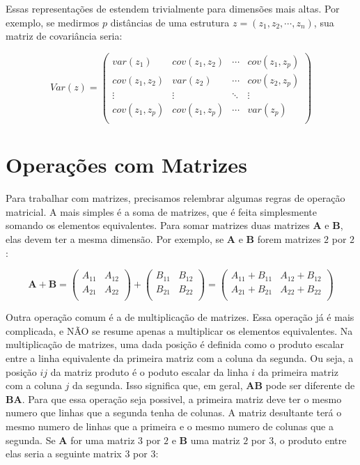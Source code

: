 \documentclass[portuges,]{tufte-handout}
\begin{document}
Essas representações de estendem trivialmente para dimensões mais altas.
Por exemplo, se medirmos \(p\) distâncias de uma estrutura
\(z = (z_1, z_2, \cdots, z_n)\), sua matriz de covariância seria:

\[
Var(z) = \left (
\begin{matrix}
var(z_1) & cov(z_1, z_2) & \cdots & cov(z_1, z_p) \\
cov(z_1, z_2) & var(z_2) & \cdots & cov(z_2, z_p) \\
\vdots & \vdots  & \ddots & \vdots                \\
cov(z_1, z_p) & cov(z_1, z_p) & \cdots & var(z_p) \\
\end{matrix}
\right )
\]

\section{Operações com Matrizes}\label{operauxe7uxf5es-com-matrizes}

Para trabalhar com matrizes, precisamos relembrar algumas regras de
operação matricial. A mais simples é a soma de matrizes, que é feita
simplesmente somando os elementos equivalentes. Para somar matrizes duas
matrizes \(\mathbf{A}\) e \(\mathbf{B}\), elas devem ter a mesma
dimensão. Por exemplo, se \(\mathbf{A}\) e \(\mathbf{B}\) forem matrizes
\(2\) por \(2\):

\[
\mathbf{A} + \mathbf{B} =
\left (
\begin{matrix}
A_{11} & A_{12}\\
A_{21} & A_{22}  \\
\end{matrix}
\right )
+
\left (
\begin{matrix}
B_{11} & B_{12}\\
B_{21} & B_{22}  \\
\end{matrix}
\right )
=
 \left (
\begin{matrix}
A_{11}+B_{11} & A_{12}+B_{12}\\
A_{21}+B_{21} & A_{22}+B_{22} \\
\end{matrix}
\right )
\]

Outra operação comum é a de multiplicação de matrizes. Essa operação já
é mais complicada, e NÃO se resume apenas a multiplicar os elementos
equivalentes. Na multiplicação de matrizes, uma dada posição é definida
como o produto escalar entre a linha equivalente da primeira matriz com
a coluna da segunda. Ou seja, a posição \(ij\) da matriz produto é o
poduto escalar da linha \(i\) da primeira matriz com a coluna \(j\) da
segunda. Isso significa que, em geral, \(\mathbf{A}\mathbf{B}\) pode ser
diferente de \(\mathbf{B}\mathbf{A}\). Para que essa operação seja
possivel, a primeira matriz deve ter o mesmo numero que linhas que a
segunda tenha de colunas. A matriz desultante terá o mesmo numero de
linhas que a primeira e o mesmo numero de colunas que a segunda. Se
\(\mathbf{A}\) for uma matriz \(3\) por \(2\) e \(\mathbf{B}\) uma
matriz \(2\) por \(3\), o produto entre elas seria a seguinte matrix
\(3\) por \(3\):
\end{document}

